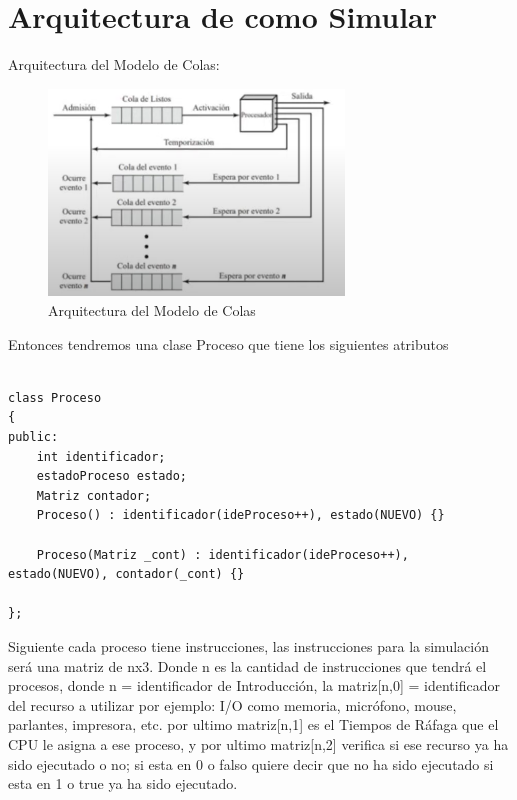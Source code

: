 \documentclass[12pt,a4paper]{article}
\begin{document}
\newpage
\section{Arquitectura de como Simular}
Arquitectura del Modelo de Colas:
\begin{figure}[h]
    \centering
    \caption{Arquitectura del Modelo de Colas} 
    \includegraphics[width=0.7\textwidth]{images/procesos.png}
    
\end{figure}
Entonces tendremos una clase Proceso que tiene los siguientes atributos
\begin{lstlisting}
    
class Proceso
{
public:
	int identificador;
	estadoProceso estado;
    Matriz contador;
    Proceso() : identificador(ideProceso++), estado(NUEVO) {}

    Proceso(Matriz _cont) : identificador(ideProceso++), estado(NUEVO), contador(_cont) {}

};
\end{lstlisting}

Siguiente cada proceso tiene instrucciones, las instrucciones para la simulación será una matriz de nx3.
Donde n es la cantidad de instrucciones que tendrá el procesos, donde n = identificador de Introducción,
la matriz[n,0] = identificador del recurso a utilizar por ejemplo: I/O como memoria, micrófono, mouse, parlantes, impresora, etc.
por ultimo matriz[n,1] es el Tiempos de Ráfaga que el CPU le asigna a ese proceso, y por ultimo matriz[n,2] verifica si ese recurso ya ha sido ejecutado o no;
si esta en 0 o falso quiere decir que no ha sido ejecutado si esta en 1 o true ya ha sido ejecutado.
\end{document}
